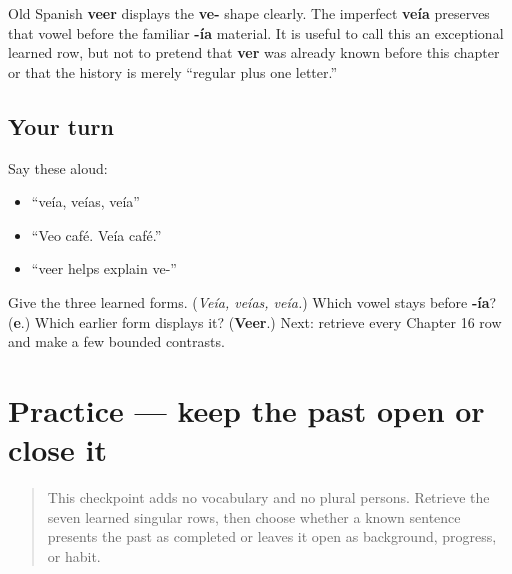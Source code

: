\begin{cousinweb}
Old Spanish \textbf{veer} displays the \textbf{ve-} shape clearly. The imperfect \textbf{veía} preserves that vowel before the familiar \textbf{-ía} material. It is useful to call this an exceptional learned row, but not to pretend that \textbf{ver} was already known before this chapter or that the history is merely “regular plus one letter.”
\end{cousinweb}

\subsection*{Your turn}
Say these aloud:

\begin{itemize}
\raggedright
  \item “veía, veías, veía”
  \item “Veo café. Veía café.”
  \item “veer helps explain ve-”
\end{itemize}

\begin{tcolorbox}[breakable,colback=teal!4,colframe=teal!35!black,title={Before you move on}]
Give the three learned forms. (\emph{Veía, veías, veía.}) Which vowel stays before \textbf{-ía}? (\textbf{e}.) Which earlier form displays it? (\textbf{Veer}.) Next: retrieve every Chapter 16 row and make a few bounded contrasts.
\end{tcolorbox}
\section[Practice]{Practice — keep the past open or close it}

\label{lesson:ES-C16-practice}



\begin{quote}
This checkpoint adds no vocabulary and no plural persons. Retrieve the seven learned singular rows, then choose whether a known sentence presents the past as completed or leaves it open as background, progress, or habit.
\end{quote}

